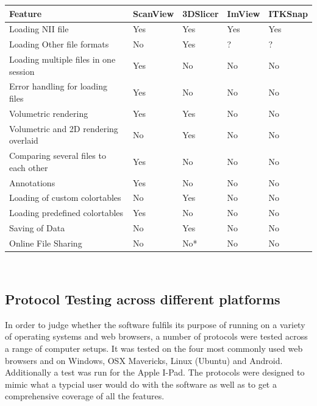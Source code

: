 \documentclass[a4paper,11pt,titlepage]{article}
\begin{document}
\begin{center}

  \begin{tabular}{ | l | l | l | l | l |}
    \hline
    Feature & ScanView & 3DSlicer & ImView & ITKSnap \\ \hline \hline

Loading NII file & Yes & Yes & Yes & Yes\\ \hline
Loading Other file formats & No & Yes & ? & ?\\ \hline
Loading multiple files in one session & Yes & No & No & No \\ \hline
Error handling for loading files & Yes & No & No & No\\ \hline
Volumetric rendering & Yes & Yes & No & No\\ \hline
Volumetric and 2D rendering overlaid & No & Yes & No & No \\ \hline
Comparing several files to each other & Yes & No & No & No\\ \hline
Annotations & Yes & No & No & No\\ \hline
Loading of custom colortables & No & Yes & No & No \\ \hline
Loading predefined colortables & Yes & No & No & No\\ \hline
Saving of Data & No & Yes & No & No\\ \hline
Online File Sharing & No & No* & No & No\\ \hline

  \end{tabular}\\


\end{center}





\subsection{Protocol Testing across different platforms}

In order to judge whether the software fulfils its purpose of running on a variety of operating systems and web browsers, a number of protocols were tested across a range of computer setups. It was tested on the four most commonly used web browsers and on Windows, OSX Mavericks, Linux (Ubuntu) and Android. Additionally a test was run for the Apple I-Pad. The protocols were designed to mimic what a typcial user would do with the software as well as to get a comprehensive coverage of all the features.
\end{document}
